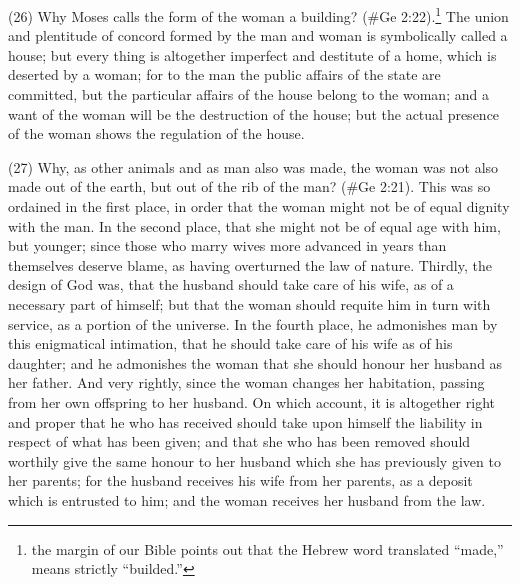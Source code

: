 (26) Why Moses calls the form of the woman a building? (\#Ge 2:22).\footnote{the margin of our Bible
points out that the Hebrew word translated ``made,'' means strictly ``builded.''} The union and plentitude of concord
formed by the man and woman is symbolically called a house; but every thing is altogether
imperfect and destitute of a home, which is deserted by a woman; for to the man the public affairs
of the state are committed, but the particular affairs of the house belong to the woman; and a want
of the woman will be the destruction of the house; but the actual presence of the woman shows the
regulation of the house.

(27) Why, as other animals and as man also was made, the woman was not also made out of the
earth, but out of the rib of the man? (\#Ge 2:21). This was so ordained in the first place, in
order that the woman might not be of equal dignity with the man. In the second place, that she might
not be of equal age with him, but younger; since those who marry wives more advanced in years
than themselves deserve blame, as having overturned the law of nature. Thirdly, the design of God
was, that the husband should take care of his wife, as of a necessary part of himself; but that the
woman should requite him in turn with service, as a portion of the universe. In the fourth place, he
admonishes man by this enigmatical intimation, that he should take care of his wife as of his
daughter; and he admonishes the woman that she should honour her husband as her father. And
very rightly, since the woman changes her habitation, passing from her own offspring to her
husband. On which account, it is altogether right and proper that he who has received should take
upon himself the liability in respect of what has been given; and that she who has been removed
should worthily give the same honour to her husband which she has previously given to her
parents; for the husband receives his wife from her parents, as a deposit which is entrusted to him;
and the woman receives her husband from the law.

